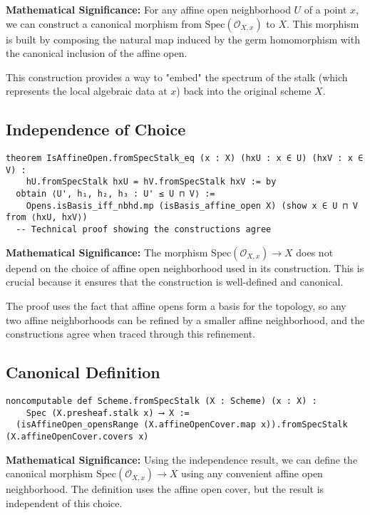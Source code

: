 \documentclass{article}
\theoremstyle{definition}
\begin{document}
\textbf{Mathematical Significance:} For any affine open neighborhood $U$ of a point $x$, we can construct a canonical morphism from $\mathrm{Spec}(\mathcal{O}_{X,x})$ to $X$. This morphism is built by composing the natural map induced by the germ homomorphism with the canonical inclusion of the affine open.

This construction provides a way to "embed" the spectrum of the stalk (which represents the local algebraic data at $x$) back into the original scheme $X$.

\subsection{Independence of Choice}

\begin{lstlisting}
theorem IsAffineOpen.fromSpecStalk_eq (x : X) (hxU : x ∈ U) (hxV : x ∈ V) :
    hU.fromSpecStalk hxU = hV.fromSpecStalk hxV := by
  obtain ⟨U', h₁, h₂, h₃ : U' ≤ U ⊓ V⟩ :=
    Opens.isBasis_iff_nbhd.mp (isBasis_affine_open X) (show x ∈ U ⊓ V from ⟨hxU, hxV⟩)
  -- Technical proof showing the constructions agree
\end{lstlisting}

\textbf{Mathematical Significance:} The morphism $\mathrm{Spec}(\mathcal{O}_{X,x}) \to X$ does not depend on the choice of affine open neighborhood used in its construction. This is crucial because it ensures that the construction is well-defined and canonical.

The proof uses the fact that affine opens form a basis for the topology, so any two affine neighborhoods can be refined by a smaller affine neighborhood, and the constructions agree when traced through this refinement.

\subsection{Canonical Definition}

\begin{lstlisting}
noncomputable def Scheme.fromSpecStalk (X : Scheme) (x : X) :
    Spec (X.presheaf.stalk x) ⟶ X :=
  (isAffineOpen_opensRange (X.affineOpenCover.map x)).fromSpecStalk (X.affineOpenCover.covers x)
\end{lstlisting}

\textbf{Mathematical Significance:} Using the independence result, we can define the canonical morphism $\mathrm{Spec}(\mathcal{O}_{X,x}) \to X$ using any convenient affine open neighborhood. The definition uses the affine open cover, but the result is independent of this choice.
\end{document}
